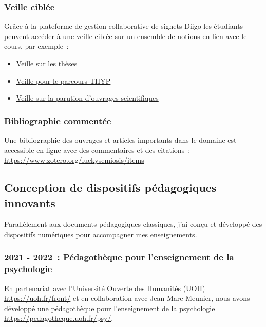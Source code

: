 \documentclass[
  a4paper,
  DIV=11,
  numbers=noendperiod]{scrreprt}
\begin{document}
\subsubsection{Veille ciblée}\label{veille-cibluxe9e}

Grâce à la plateforme de gestion collaborative de signets Diigo les
étudiants peuvent accéder à une veille ciblée sur un ensemble de notions
en lien avec le cours, par exemple~:

\begin{itemize}
\item
  \href{https://www.diigo.com/user/luckysemiosis?query=\%23th\%C3\%A8se}{Veille
  sur les thèses}
\item
  \href{https://www.diigo.com/user/luckysemiosis?query=\%23THYP}{Veille
  pour le parcours THYP}
\item
  \href{https://www.diigo.com/user/luckysemiosis?query=\%23actulivre}{Veille
  sur la parution d'ouvrages scientifiques}
\end{itemize}

\subsubsection{Bibliographie
commentée}\label{bibliographie-commentuxe9e}

Une bibliographie des ouvrages et articles importants dans le domaine
est accessible en ligne avec des commentaires et des citations~:
\href{https://www.zotero.org/luckysemiosis/items}{\ul{https://www.zotero.org/luckysemiosis/items}}~~

\subsection{Conception de dispositifs pédagogiques
innovants}\label{conception-de-dispositifs-puxe9dagogiques-innovants}

Parallèlement aux documents pédagogiques classiques, j'ai conçu et
développé des dispositifs numériques pour accompagner mes enseignements.

\subsubsection*{2021 - 2022~: Pédagothèque pour l'enseignement de la
psychologie}\label{sec-porjetPedagotheque}

En partenariat avec l'Université Ouverte des Humanités (UOH)
\url{https://uoh.fr/front/} et en collaboration avec Jean-Marc Meunier,
nous avons développé une pédagothèque pour l'enseignement de la
psychologie \url{https://pedagotheque.uoh.fr/psy/}.
\end{document}
